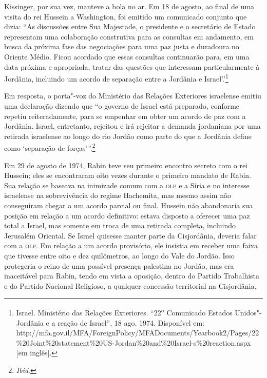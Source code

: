 Kissinger, por sua vez, manteve a bola no ar. Em 18 de agosto, ao final
de uma visita do rei Hussein a Washington, foi emitido um comunicado
conjunto que dizia: ``As discussões entre Sua Majestade, o presidente e
o secretário de Estado representam uma colaboração construtiva para as
consultas em andamento, em busca da próxima fase das negociações para
uma paz justa e duradoura no Oriente Médio. Ficou acordado que essas
consultas continuarão para, em uma data próxima e apropriada, tratar das
questões que interessam particularmente à Jordânia, incluindo um acordo
de separação entre a Jordânia e Israel'.'\footnote{Israel. Ministério das Relações Exteriores. 
``22\textsuperscript{o} Comunicado Estados Unidos"-Jordânia e a reação de Israel'', 18 ago. 1974. Disponível em: http://mfa.gov.il/MFA/ForeignPolicy/MFADocuments/Yearbook2/Pages/22\%20Joint\%20statement\%20US-Jordan\%20and\%20Israel-s\%20reaction.aspx
{[}em inglês{]}.}

Em resposta, o porta"-voz do Ministério das Relações Exteriores israelense
emitiu uma declaração dizendo que ``o governo de Israel está preparado,
conforme repetiu reiteradamente, para se empenhar em obter um acordo de
paz com a Jordânia. Israel, entretanto, rejeitou e irá rejeitar a
demanda jordaniana por uma retirada israelense ao longo do rio Jordão
como parte do que a Jordânia define como `separação de
forças'''.\footnote{\textit{Ibid}.}

Em 29 de agosto de 1974, Rabin teve seu primeiro encontro secreto com o
rei Hussein; eles se encontraram oito vezes durante o primeiro mandato
de Rabin. Sua relação se baseava na inimizade comum com a \textsc{olp} e a Síria
e no interesse israelense na sobrevivência do regime Hachemita, mas
mesmo assim não conseguiram chegar a um acordo parcial ou final. Hussein
não abandonaria sua posição em relação a um acordo definitivo: estava
disposto a oferecer uma paz total a Israel, mas somente em troca de uma
retirada completa, incluindo Jerusalém Oriental. Se Israel quisesse
manter parte da Cisjordânia, deveria falar com a \textsc{olp}. Em relação a um
acordo provisório, ele insistia em receber uma faixa que tivesse entre
oito e dez quilômetros, ao longo do Vale do Jordão. Isso protegeria o
reino de uma possível presença palestina no Jordão, mas era inaceitável
para Rabin, tendo em vista a oposição, dentro do Partido Trabalhista e
do Partido Nacional Religioso, a qualquer concessão territorial na
Cisjordânia.


